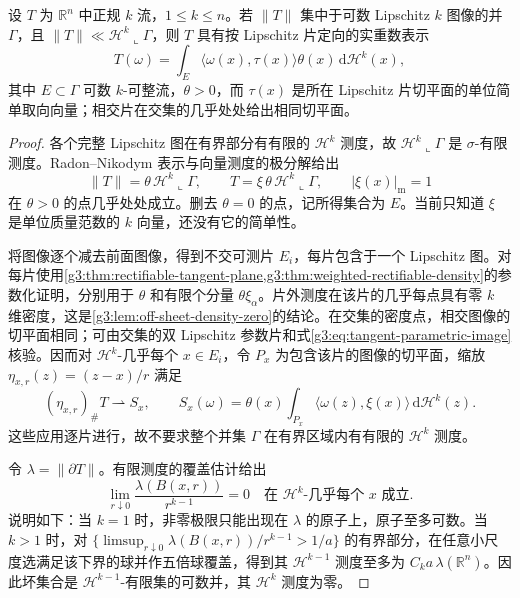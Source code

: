 \begin{lemma}\label{g3:lem:normal-current-tangent-orientation}
	设 \(T\) 为 \(\mathbb R^n\) 中正规 \(k\) 流，\(1\le k\le n\)。若 \(\|T\|\) 集中于可数 Lipschitz \(k\) 图像的并 \(\Gamma\)，且
	\(\|T\|\ll\mathcal H^k\llcorner\Gamma\)，则 \(T\) 具有按 Lipschitz 片定向的实重数表示
	\[
		T(\omega)=\int_E\langle\omega(x),\tau(x)\rangle\theta(x)\,
		\mathrm d\mathcal H^k(x),
	\]
	其中 \(E\subset\Gamma\) 可数 \(k\)-可整流，\(\theta>0\)，而 \(\tau(x)\) 是所在 Lipschitz 片切平面的单位简单取向向量；相交片在交集的几乎处处给出相同切平面。
\end{lemma}
\begin{proof}
	各个完整 Lipschitz 图在有界部分有有限的 \(\mathcal H^k\) 测度，故 \(\mathcal H^k\llcorner\Gamma\) 是 \(\sigma\)-有限测度。Radon--Nikodym 表示与向量测度的极分解给出
	\[
		\|T\|=\theta\,\mathcal H^k\llcorner\Gamma,\qquad
		T=\xi\,\theta\,\mathcal H^k\llcorner\Gamma,\qquad
		|\xi(x)|_{\mathrm m}=1
	\]
	在 \(\theta>0\) 的点几乎处处成立。删去 \(\theta=0\) 的点，记所得集合为 \(E\)。当前只知道 \(\xi\) 是单位质量范数的 \(k\) 向量，还没有它的简单性。

	将图像逐个减去前面图像，得到不交可测片 \(E_i\)，每片包含于一个 Lipschitz 图。对每片使用\cref{g3:thm:rectifiable-tangent-plane,g3:thm:weighted-rectifiable-density}的参数化证明，分别用于 \(\theta\) 和有限个分量 \(\theta\xi_\alpha\)。片外测度在该片的几乎每点具有零 \(k\) 维密度，这是\cref{g3:lem:off-sheet-density-zero}的结论。在交集的密度点，相交图像的切平面相同；可由交集的双 Lipschitz 参数片和式\eqref{g3:eq:tangent-parametric-image}核验。因而对 \(\mathcal H^k\)-几乎每个 \(x\in E_i\)，令 \(P_x\) 为包含该片的图像的切平面，缩放
	\(\eta_{x,r}(z)=(z-x)/r\) 满足
	\begin{equation}\label{g3:eq:current-vector-plane-blowup}
		(\eta_{x,r})_\#T\rightharpoonup S_x,\qquad
		S_x(\omega)=\theta(x)\int_{P_x}\langle\omega(z),\xi(x)\rangle\,
		\mathrm d\mathcal H^k(z).
	\end{equation}
	这些应用逐片进行，故不要求整个并集 \(\Gamma\) 在有界区域内有有限的 \(\mathcal H^k\) 测度。

	令 \(\lambda=\|\partial T\|\)。有限测度的覆盖估计给出
	\begin{equation}\label{g3:eq:boundary-mass-vanishing-at-k-points}
		\lim_{r\downarrow0}\frac{\lambda(B(x,r))}{r^{k-1}}=0
		\quad\text{在 }\mathcal H^k\text{-几乎每个 }x\text{ 成立}.
	\end{equation}
	说明如下：当 \(k=1\) 时，非零极限只能出现在 \(\lambda\) 的原子上，原子至多可数。当 \(k>1\) 时，对
	\(\{\limsup_{r\downarrow0}\lambda(B(x,r))/r^{k-1}>1/a\}\)
	的有界部分，在任意小尺度选满足该下界的球并作五倍球覆盖，得到其 \(\mathcal H^{k-1}\) 测度至多为 \(C_ka\,\lambda(\mathbb R^n)\)。因此坏集合是 \(\mathcal H^{k-1}\)-有限集的可数并，其 \(\mathcal H^k\) 测度为零。


\end{proof}
